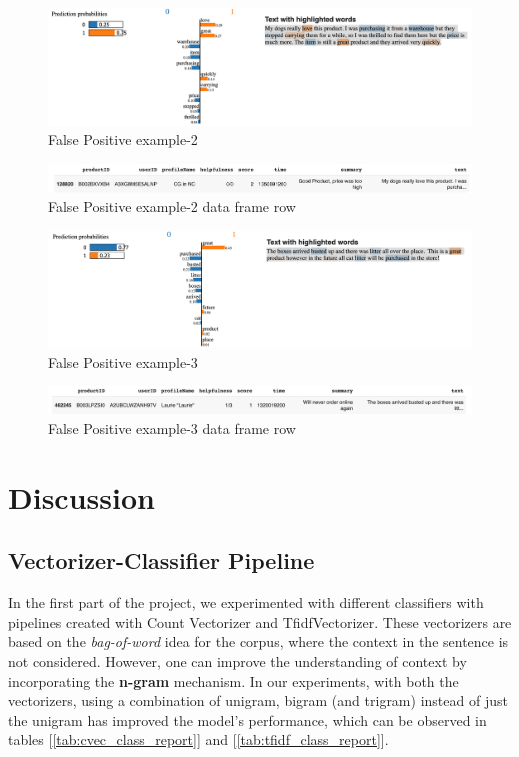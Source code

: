 \documentclass[11pt]{article}
\begin{document}
\begin{figure}
    \centering
    \includegraphics[scale=0.4]{figures/fp5.png}
    \caption{False Positive example-2}
    \label{fig:fp5}
\end{figure}
\begin{figure}
    \centering
    \includegraphics[scale=0.4]{figures/fp5_row.png}
    \caption{False Positive example-2 data frame row}
    \label{fig:fp5_row}
\end{figure}
\begin{figure}
    \centering
    \includegraphics[scale=0.4]{figures/fp6.png}
    \caption{False Positive example-3}
    \label{fig:fp6}
\end{figure}
 \begin{figure}
    \centering
    \includegraphics[scale=0.4]{figures/fp6_row.png}
    \caption{False Positive example-3 data frame row}
    \label{fig:fp6_row}
\end{figure} 

 \section{Discussion}
 \subsection{Vectorizer-Classifier Pipeline}
In the first part of the project, we experimented with different classifiers with pipelines created with Count Vectorizer and TfidfVectorizer. These vectorizers are based on the \textit{bag-of-word} idea for the corpus, where the context in the sentence is not considered. However, one can improve the understanding of context by incorporating the \textbf{n-gram} mechanism. In our experiments, with both the vectorizers, using a combination of unigram, bigram (and trigram) instead of just the unigram has improved the model's performance, which can be observed in tables  [\ref{tab:cvec_class_report}] and  [\ref{tab:tfidf_class_report}].
\end{document}
